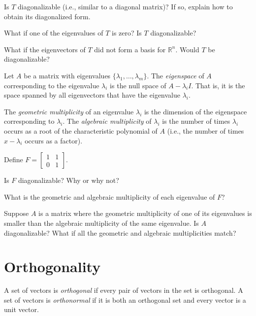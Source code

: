 \documentclass{problemset}
\newcommand{\R}{\mathbb{R}}
\newcommand{\mat}[1]{\begin{bmatrix}#1\end{bmatrix}}
\begin{document}
	\begin{parts}
	\item Is $T$ diagonalizable (i.e., similar to a diagonal matrix)?  If so, explain how to obtain its diagonalized form.
		\item What if one of the eigenvalues of $T$ is zero?  Is $T$ diagonalizable?
		\item What if the eigenvectors of $T$ did not form a basis for $\R^n$.
			Would $T$ be diagonalizable?
	\end{parts}

	\begin{definition}[Eigenspace]
	Let $A$ be a matrix with eigenvalues $\{\lambda_1,\ldots,\lambda_m\}$.  The
	\emph{eigenspace} of $A$ corresponding to the eigenvalue $\lambda_i$ is the
	null space of $A-\lambda_i I$.  That is, it is the space spanned by all eigenvectors
	that have the eigenvalue $\lambda_i$.

	The \emph{geometric multiplicity} of an eigenvalue $\lambda_i$ is the dimension
	of the eigenspace corresponding to $\lambda_i$.  The \emph{algebraic multiplicity}
	of $\lambda_i$ is the number of times $\lambda_i$ occurs as a root of the
	characteristic polynomial of $A$ (i.e., the number of times $x-\lambda_i$
	occurs as a factor).
	\end{definition}

	\question
	Define $F=\mat{1&1\\0&1}$.
	\begin{parts}
		\item Is $F$ diagonalizable?  Why or why not?
		\item What is the geometric and algebraic multiplicity of each eigenvalue
			of $F$?
		\item Suppose $A$ is a matrix where the geometric multiplicity of one of its eigenvalues
			is smaller than the algebraic multiplicity of the same eigenvalue.  Is
			$A$ diagonalizable?  What if all the geometric and algebraic multiplicities
			match?
	\end{parts}

\newpage

\section*{Orthogonality}
	\begin{definition}
		A set of vectors is \emph{orthogonal} if every pair of vectors
		in the set is orthogonal.  A set of vectors is \emph{orthonormal}
		if it is both an orthogonal set and every vector is a unit vector.
	\end{definition}
\end{document}

